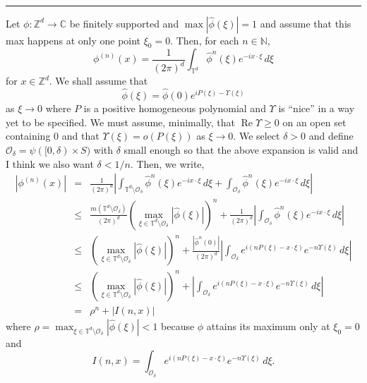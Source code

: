 \documentclass[11pt]{article}
\renewcommand\Re{\operatorname{Re}}%
\newcommand{\f}[2]{\frac{#1}{#2}}
\begin{document}
$\,$\\

\hrule

Let $\phi:\mathbb{Z}^d\to\mathbb{C}$ be finitely supported and $\max{|\widehat{\phi}(\xi)|}=1$ and assume that this max happens at only one point $\xi_0=0$. Then, for each $n\in\mathbb{N}$,
\begin{equation*}
    \phi^{(n)}(x)=\frac{1}{(2\pi)^d}\int_{\mathbb{T}^d}\widehat{\phi}^n(\xi)e^{-ix\cdot\xi}\,d\xi
\end{equation*}
for $x\in\mathbb{Z}^d$. We shall assume that
\begin{equation*}
    \widehat{\phi}(\xi)=\widehat{\phi}(0)e^{iP(\xi)-\Upsilon(\xi)}
\end{equation*}
as $\xi\to 0$ where $P$ is a positive homogeneous polynomial and $\Upsilon$ is ``nice'' in a way yet to be specified. We must assume, minimally, that $\Re{\Upsilon} \geq 0$ on an open set containing $0$ and that $\Upsilon(\xi)=o(P(\xi))$ as $\xi\to 0$. We select $\delta>0$ and define $\mathcal{O}_\delta=\psi([0,\delta)\times S)$ with $\delta$ small enough so that the above expansion is valid and I think we also want $\delta<1/n$. Then, we write,
\begin{eqnarray*}
|\phi^{(n)}(x)|&=& \f{1}{(2\pi)^d} \left|\int_{\mathbb{T}^d\setminus \mathcal{O}_\delta}\widehat{\phi}^n(\xi)e^{-ix\cdot\xi}\,d\xi+\int_{\mathcal{O}_\delta}\widehat{\phi}^{n}(\xi)e^{-ix\cdot\xi}\,d\xi\right|\\
&\leq &  \f{m(\mathbb{T}^d\setminus \mathcal{O}_\delta)}{(2\pi)^d}\left(\max_{\xi\in\mathbb{T}^d\setminus\mathcal{O}_\delta}|\widehat{\phi}(\xi)|\right)^n+\frac{1}{(2\pi)^d}\left|\int_{\mathcal{O}_\delta}\widehat{\phi}^n(\xi)e^{-ix\cdot\xi}\,d\xi\right|\\
&\leq& \left(\max_{\xi\in\mathbb{T}^d\setminus\mathcal{O}_\delta}|\widehat{\phi}(\xi)|\right)^n+\frac{|\widehat{\phi}^n(0)|}{(2\pi)^d}\left|\int_{\mathcal{O}_\delta}e^{i(nP(\xi)-x\cdot\xi)}e^{-n\Upsilon(\xi)}\,d\xi\right|\\
&\leq& \left( \max_{\xi\in\mathbb{T}^d\setminus\mathcal{O}_\delta}|\widehat{\phi}(\xi)| \right)^n+\left|\int_{\mathcal{O}_\delta}e^{i(nP(\xi)-x\cdot\xi)}e^{-n\Upsilon(\xi)}\,d\xi\right|\\
&=& \rho^n+\left|I(n,x)\right|
\end{eqnarray*}
where $\rho=\max_{\xi\in\mathbb{T}^d\setminus\mathcal{O}_\delta}|\widehat{\phi}(\xi)|<1$ because $\widehat{\phi}$ attains its maximum only at $\xi_0=0$ and
\begin{equation*}
    I(n,x)=\int_{\mathcal{O}_\delta}e^{i(nP(\xi)-x\cdot\xi)}e^{-n\Upsilon(\xi)}\,d\xi.
\end{equation*}
\end{document}
